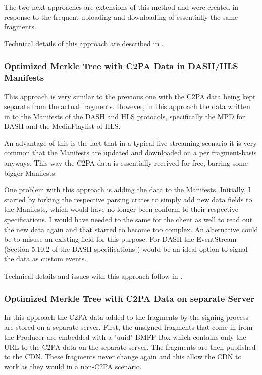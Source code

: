 The two next approaches are extensions of this method and were created in response to the frequent uploading and downloading of essentially the same fragments.

Technical details of this approach are described in .

\subsubsection{Optimized Merkle Tree with C2PA Data in DASH/HLS Manifests}

This approach is very similar to the previous one with the C2PA data being kept separate from the actual fragments. However, in this approach the data written in to the Manifests of the DASH and HLS protocols, specifically the MPD for DASH and the MediaPlaylist of HLS.

An advantage of this is the fact that in a typical live streaming scenario it is very common that the Manifests are updated and downloaded on a per fragment-basis anyways. This way the C2PA data is essentially received for free, barring some bigger Manifests.

One problem with this approach is adding the data to the Manifests. Initially, I started by forking the respective parsing crates to simply add new data fields to the Manifests, which would have no longer been conform to their respective specifications. I would have needed to the same for the client as well to read out the new data again and that started to become too complex. An alternative could be to misuse an existing field for this purpose. For DASH the EventStream (Section 5.10.2 of the DASH specifications \cite{DASH}) would be an ideal option to signal the data as custom events. 

Technical details and issues with this approach follow in .

\subsubsection{Optimized Merkle Tree with C2PA Data on separate Server}

In this approach the C2PA data added to the fragments by the signing process are stored on a separate server. First, the unsigned fragments that come in from the Producer are embedded with a "uuid" BMFF Box which contains only the URL to the C2PA data on the separate server. The fragments are then published to the CDN. These fragments never change again and this allow the CDN to work as they would in a non-C2PA scenario.

